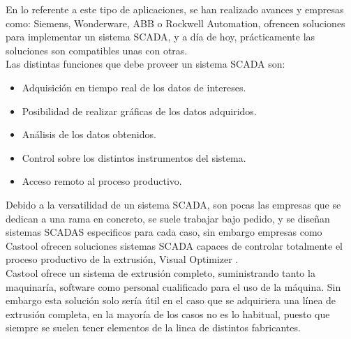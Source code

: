 En lo referente a este tipo de aplicaciones, se han realizado avances y empresas como: Siemens, Wonderware, ABB o Rockwell Automation, ofrencen soluciones para implementar un sistema SCADA, y a día de hoy, prácticamente las soluciones son compatibles unas con otras.\\

Las distintas funciones que debe proveer un sistema SCADA son:

\begin{itemize}
    \item{Adquisición en tiempo real de los datos de intereses.}
    \item{Posibilidad de realizar gráficas de los datos adquiridos.}
    \item{Análisis de los datos obtenidos.}
    \item{Control sobre los distintos instrumentos del sistema.}
    \item{Acceso remoto al proceso productivo.}
\end{itemize}

Debido a la versatilidad de un sistema SCADA, son pocas las empresas que se dedican a una rama en concreto, se suele trabajar bajo pedido, y se diseñan sistemas SCADAS especificos para cada caso, sin embargo empresas como Castool ofrecen soluciones sistemas SCADA capaces de controlar totalmente el proceso productivo de la extrusión, Visual Optimizer \cite{castool}.\\

Castool ofrece un sistema de extrusión completo, suministrando tanto la maquinaría, software como personal cualificado para el uso de la máquina. Sin embargo esta solución solo sería útil en el caso que se adquiriera una línea de extrusión completa, en la mayoría de los casos no es lo habitual, puesto que siempre se suelen tener elementos de la linea de distintos fabricantes.\\






